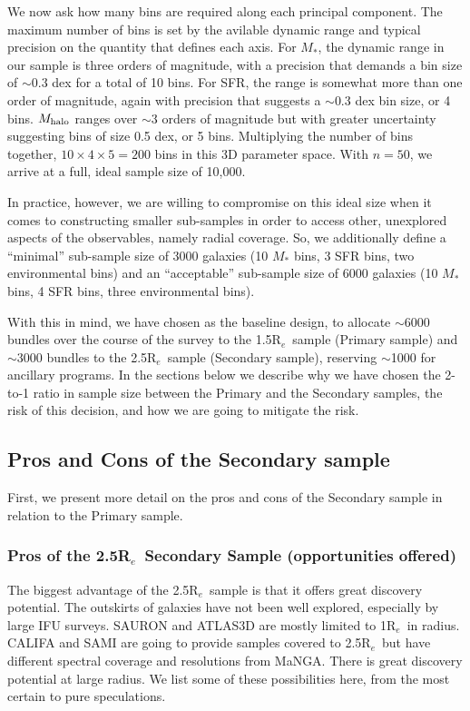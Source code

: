 \documentclass[preprint,11pt]{aastex}
\newcommand{\Reff}{{R$_{e}$}}
\begin{document}
We now ask how many bins are required along each principal component.  The maximum number of bins is set by the avilable dynamic
range and typical precision on the quantity that defines each axis.  For $M_*$, the dynamic range in our sample is three orders of
magnitude, with a precision that demands a bin size of $\sim$0.3 dex for a total of 10 bins.  For SFR, the range is somewhat more than
one order of magnitude, again with precision that suggests a $\sim$0.3 dex bin size, or 4 bins.  $M_{\rm halo}$ ranges over $\sim$3 orders
of magnitude but with greater uncertainty suggesting bins of size 0.5 dex, or 5 bins.  Multiplying the number of bins together,
$10 \times 4 \times 5 = 200$ bins in this 3D parameter space.  With $n=50$, we arrive at a full, ideal sample size of 10,000.

In practice, however, we are willing to compromise on this ideal size when it comes to constructing smaller sub-samples in order to
access other, unexplored aspects of the observables, namely radial coverage.  So, we additionally define a ``minimal'' sub-sample size
of 3000 galaxies (10 $M_*$ bins, 3 SFR bins, two environmental bins) and an ``acceptable'' sub-sample size of 6000 galaxies (10
$M_*$ bins, 4 SFR bins, three environmental bins).  

With this in mind, we have chosen as the baseline design, to allocate $\sim$6000 bundles over the course of the survey to the
1.5\Reff\ sample (Primary sample) and $\sim$3000 bundles to the 2.5\Reff\ sample (Secondary sample), reserving $\sim$1000 for
ancillary programs.  In the sections below we describe why we have chosen the 2-to-1 ratio in sample size between
the Primary and the Secondary samples, the risk of this decision, and how we are going to mitigate the risk.

\subsection{Pros and Cons of the Secondary sample}

First, we present more detail on the pros and cons of the Secondary sample in relation to the Primary sample.  

\subsubsection{Pros of the 2.5\Reff\ Secondary Sample (opportunities offered)}

The biggest advantage of the 2.5\Reff\ sample is that it offers great
discovery potential. The outskirts of galaxies have not been well
explored, especially by large IFU surveys. SAURON \citep{dezeeuw2002}
and ATLAS3D \citep{cappellari2011} are
mostly limited to 1\Reff\ in radius. CALIFA \citep{sanchez2012} and
SAMI \citep{Croom2012} are going to
provide samples covered to 2.5\Reff\ but have different spectral
coverage and resolutions from MaNGA. There is great discovery
potential at large radius. We list some of these possibilities here,
from the most certain to pure speculations.
\end{document}
